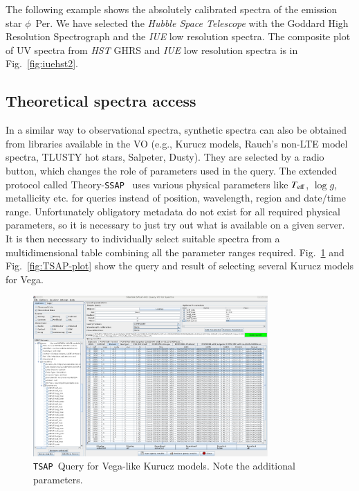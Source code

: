 \documentclass[final,authoryear,5p,times,twocolumn]{elsarticle}
\newcommand{\ssap}{\texttt{SSAP}}
\newcommand{\tsap}{\texttt{TSAP}}
\begin{document}
The following example 
shows the 
absolutely calibrated spectra of the emission star $\phi$~Per. We have selected the
\emph{Hubble Space Telescope} with the Goddard High Resolution Spectrograph
and
the \emph{IUE} low resolution spectra.
The
composite plot of UV spectra from \emph{HST} GHRS and \emph{IUE} low
resolution spectra is in Fig.~\ref{fig:iuehst2}.

\subsection{ Theoretical spectra access}

In a similar way to observational spectra, synthetic spectra can also be
obtained from libraries available in the VO (e.g., Kurucz models, Rauch's
non-LTE model spectra, TLUSTY hot stars, Salpeter, Dusty). They are selected
by a radio button, which changes the role of parameters used in the query. The
extended protocol called Theory-\ssap\ \citep[hereafter TSAP;][]{ssap} uses
various physical parameters like $T_{\rm eff}$, $\log g$, metallicity etc. for
queries instead of position, wavelength, region and date/time range.
Unfortunately obligatory metadata do not exist for all required physical
parameters, so it is necessary to just try out what is available on a given
server.  It is then necessary to individually select suitable spectra from a
multidimensional table combining all the parameter ranges required.
Fig.~\ref{fig:TSAP-query} and Fig.~\ref{fig:TSAP-plot} show the query and
result of selecting several Kurucz models for Vega.


\begin{figure}[t]
\begin{center}
\includegraphics[width=0.8\textwidth]{TSSA-query.pdf}
\caption{\tsap\ Query for Vega-like Kurucz models. Note the additional parameters.}
\label{fig:TSAP-query}
\end{center}
\end{figure}
\end{document}
